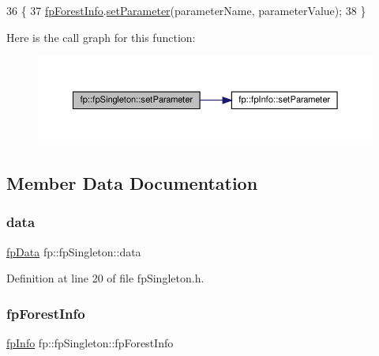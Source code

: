 \begin{DoxyCode}
36                                                                                               \{
37                 \hyperlink{classfp_1_1fpSingleton_a85965009befa72a749ae498fa5b6ccfa}{fpForestInfo}.\hyperlink{classfp_1_1fpInfo_ae4c749c466e983cb312cc08d38b2796e}{setParameter}(parameterName, parameterValue);
38             \}
\end{DoxyCode}
Here is the call graph for this function\+:\nopagebreak
\begin{figure}[H]
\begin{center}
\leavevmode
\includegraphics[width=350pt]{classfp_1_1fpSingleton_a3465c3ff9376fae2933d9267c32761ca_cgraph}
\end{center}
\end{figure}


\subsection{Member Data Documentation}
\mbox{\label{classfp_1_1fpSingleton_a2fa16ac6a0f66641749032eeee61b8e9}} 
\subsubsection{\texorpdfstring{data}{data}}
{\footnotesize\ttfamily \hyperlink{classfp_1_1fpData}{fp\+Data} fp\+::fp\+Singleton\+::data\hspace{0.3cm}{\ttfamily [private]}}



Definition at line 20 of file fp\+Singleton.\+h.

\mbox{\label{classfp_1_1fpSingleton_a85965009befa72a749ae498fa5b6ccfa}} 
\subsubsection{\texorpdfstring{fp\+Forest\+Info}{fpForestInfo}}
{\footnotesize\ttfamily \hyperlink{classfp_1_1fpInfo}{fp\+Info} fp\+::fp\+Singleton\+::fp\+Forest\+Info\hspace{0.3cm}{\ttfamily [private]}}



